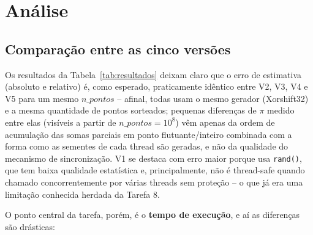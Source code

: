 \documentclass[a4paper,12pt]{article}
\begin{document}
\section{Análise}

\subsection{Comparação entre as cinco versões}

Os resultados da Tabela~\ref{tab:resultados} deixam claro que o erro
de estimativa (absoluto e relativo) é, como esperado, praticamente
idêntico entre V2, V3, V4 e V5 para um mesmo $n\_pontos$ -- afinal,
todas usam o mesmo gerador (Xorshift32) e a mesma quantidade de
pontos sorteados; pequenas diferenças de $\pi$ medido entre elas
(visíveis a partir de $n\_pontos=10^8$) vêm apenas da ordem de
acumulação das somas parciais em ponto flutuante/inteiro combinada
com a forma como as sementes de cada thread são geradas, e não da
qualidade do mecanismo de sincronização. V1 se destaca com erro maior
porque usa \texttt{rand()}, que tem baixa qualidade estatística e,
principalmente, não é thread-safe quando chamado concorrentemente
por várias threads sem proteção -- o que já era uma limitação
conhecida herdada da Tarefa 8.

O ponto central da tarefa, porém, é o \textbf{tempo de execução}, e
aí as diferenças são drásticas:
\end{document}
